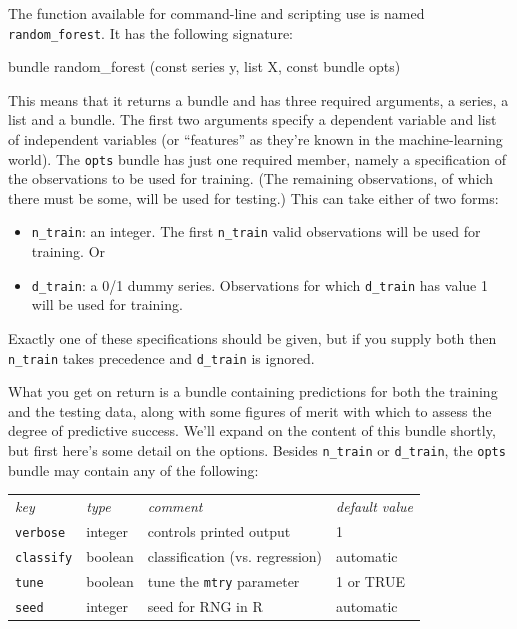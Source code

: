 \documentclass{article}
\begin{document}
The function available for command-line and scripting use is named
\texttt{random\_forest}. It has the following signature:
%
\begin{code}
bundle random_forest (const series y, list X, const bundle opts)
\end{code}
%
This means that it returns a bundle and has three required arguments,
a series, a list and a bundle. The first two arguments specify a
dependent variable and list of independent variables (or ``features''
as they're known in the machine-learning world). The \texttt{opts}
bundle has just one required member, namely a specification of the
observations to be used for training. (The remaining observations, of
which there must be some, will be used for testing.) This can take
either of two forms:
\begin{itemize}
\item \texttt{n\_train}: an integer. The first \texttt{n\_train} valid
  observations will be used for training. Or
\item \texttt{d\_train}: a 0/1 dummy series. Observations for which
  \texttt{d\_train} has value 1 will be used for training.
\end{itemize}
Exactly one of these specifications should be given, but if you supply
both then \texttt{n\_train} takes precedence and \texttt{d\_train} is
ignored.

What you get on return is a bundle containing predictions for both the
training and the testing data, along with some figures of merit with
which to assess the degree of predictive success.  We'll expand on the
content of this bundle shortly, but first here's some detail on the
options. Besides \texttt{n\_train} or \texttt{d\_train}, the
\texttt{opts} bundle may contain any of the following:

\begin{center}
\begin{tabular}{llll}
  \textit{key} & \textit{type} & \textit{comment} & \textit{default value} \\[4pt]
  \texttt{verbose} & integer & controls printed output & 1 \\
  \texttt{classify} & boolean & classification (vs. regression) & automatic\\
  \texttt{tune} & boolean & tune the \texttt{mtry} parameter & 1 or TRUE \\
  \texttt{seed} & integer & seed for RNG in \textsf{R} & automatic
\end{tabular}
\end{center}
\end{document}
